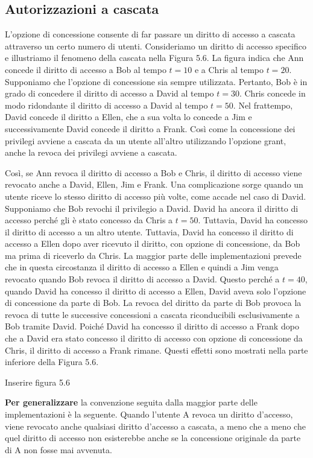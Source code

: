 \subsection{Autorizzazioni a cascata}
L'opzione di concessione consente di far passare un diritto di accesso a cascata attraverso un certo numero di utenti. 
Consideriamo un diritto di accesso specifico e illustriamo il fenomeno della cascata nella Figura 5.6. La figura indica che Ann concede il diritto di accesso a Bob al tempo $t = 10$ e a Chris al tempo $t = 20$. Supponiamo che l'opzione di concessione sia sempre utilizzata. Pertanto, Bob è in grado di concedere il diritto di accesso a David al tempo $t = 30$. Chris concede in modo ridondante il diritto di accesso a David al tempo $t = 50$. Nel frattempo, David concede il diritto a Ellen, che a sua volta lo concede a Jim e successivamente David concede il diritto a Frank. Così come la concessione dei privilegi avviene a cascata da un utente all'altro utilizzando l'opzione grant, anche la revoca dei privilegi avviene a cascata. 

\singlespacing

Così, se Ann revoca il diritto di accesso a Bob e Chris, il diritto di accesso viene revocato anche a David, Ellen, Jim e Frank. Una complicazione sorge quando un utente riceve lo stesso diritto di accesso più volte, come accade nel caso di David. Supponiamo che Bob revochi il privilegio a David. David ha ancora il diritto di accesso perché gli è stato concesso da Chris a $t = 50$. Tuttavia, David ha concesso il diritto di accesso a un altro utente. Tuttavia, David ha concesso il diritto di accesso a Ellen dopo aver ricevuto il diritto, con opzione di concessione, da Bob ma prima di riceverlo da Chris. La maggior parte delle implementazioni prevede che in questa circostanza il diritto di accesso a Ellen e quindi a Jim venga revocato quando Bob revoca il diritto di accesso a David. Questo perché a $t = 40$, quando David ha concesso il diritto di accesso a Ellen, David aveva solo l'opzione di concessione da parte di Bob. La revoca del diritto da parte di Bob provoca la revoca di tutte le successive concessioni a cascata riconducibili esclusivamente a Bob tramite David. Poiché David ha concesso il diritto di accesso a Frank dopo che a David era stato concesso il diritto di accesso con opzione di concessione da Chris, il diritto di accesso a Frank rimane. Questi effetti sono mostrati nella parte inferiore della Figura 5.6.

Inserire figura 5.6

\begin{center}
    \textbf{Per generalizzare} la convenzione seguita dalla maggior parte delle implementazioni è la seguente. Quando l'utente A revoca un diritto d'accesso, viene revocato anche qualsiasi diritto d'accesso a cascata, a meno che a meno che quel diritto di accesso non esisterebbe anche se la concessione originale da parte di A non fosse mai avvenuta.
\end{center}
